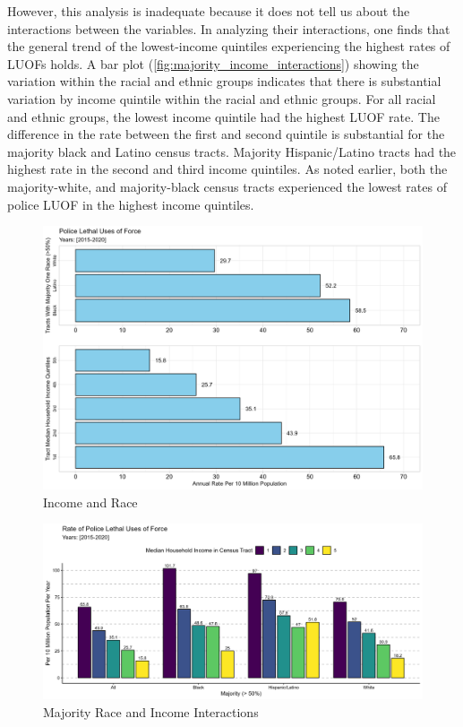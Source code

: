 \documentclass[12pt]{article}
\begin{document}
However, this analysis is inadequate because it does not tell us about the interactions between the variables. In analyzing their interactions, one finds that the general trend of the lowest-income quintiles experiencing the highest rates of LUOFs holds. A bar plot (\autoref{fig:majority_income_interactions}) showing the variation within the racial and ethnic groups indicates that there is substantial variation by income quintile within the racial and ethnic groups. For all racial and ethnic groups, the lowest income quintile had the highest LUOF rate. The difference in the rate between the first and second quintile is substantial for the majority black and Latino census tracts. Majority Hispanic/Latino tracts had the highest rate in the second and third income quintiles. As noted earlier, both the majority-white, and majority-black census tracts experienced the lowest rates of police LUOF in the highest income quintiles.

\begin{figure}[H]
  \centering %
  \includegraphics[width=\linewidth]{images/combined}
  \captionsetup{justification=centering, singlelinecheck=false, margin=2cm}
  \caption[Income and Race]{Income and Race}
  \label{fig:combined}
\end{figure}

\begin{figure}[H]
  \centering %
  \includegraphics[width=\linewidth]{images/race_only_denom_race}
  \captionsetup{justification=centering, singlelinecheck=false, margin=2cm}
  \caption[Majority Race and Income Interactions]{Majority Race and Income Interactions}
  \label{fig:majority_income_interactions}
\end{figure}
\end{document}

